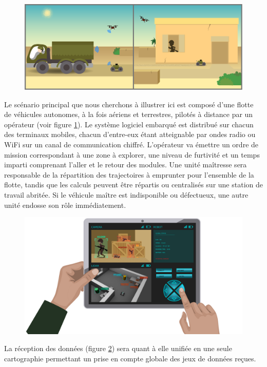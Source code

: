   \begin{figure}[h]
    \centering
      \includegraphics[width=1.\linewidth]{figures/ml_collage}  
    \label{fig:srt2M-1}
  \end{figure}
  
  Le scénario principal que nous cherchons à illustrer ici est composé d'une flotte de véhicules autonomes, à la fois aériens et terrestres, pilotés à distance par un opérateur (voir figure \ref{fig:srt2M-1}). 
  Le système logiciel embarqué est distribué sur chacun des terminaux mobiles, chacun d'entre-eux étant atteignable par ondes radio ou WiFi sur un canal de communication chiffré. 
  L'opérateur va émettre un ordre de mission correspondant à une zone à explorer, une niveau de furtivité et un temps imparti comprenant l'aller et le retour des modules.
  Une unité maîtresse sera responsable de la répartition des trajectoires à emprunter pour l'ensemble de la flotte, tandis que les calculs peuvent être répartis ou centralisés sur une station de travail abritée.
  Si le véhicule maître est indisponible ou défectueux, une autre unité endosse son rôle immédiatement. 
    \begin{figure}[h]
    \centering
      \includegraphics[width=1.\linewidth]{figures/ml_4}  
    \label{fig:srt2M-2}
  \end{figure}
  La réception des données (figure \ref{fig:srt2M-2}) sera quant à elle unifiée en une seule cartographie permettant un prise en compte globale des jeux de données reçues. 
  
